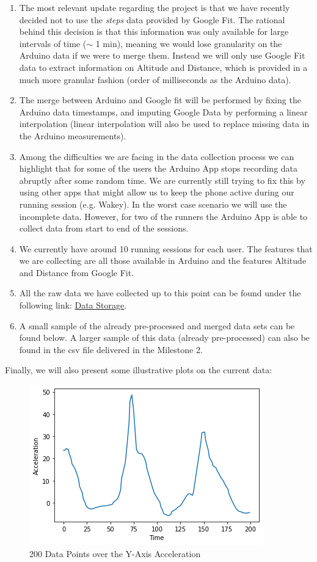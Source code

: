 \documentclass[
  12pt,
]{article}
\begin{document}
\begin{enumerate}
\item The most relevant update regarding the project is that we have recently decided not to use the \textit{steps} data provided by Google Fit. The rational behind this decision is that this information was only available for large intervals of time ($\sim$ 1 min), meaning we would lose granularity on the Arduino data if we were to merge them. Instead we will only use Google Fit data to extract information on Altitude and Distance, which is provided in a much more granular fashion (order of milliseconds as the Arduino data).
\item The merge between Arduino and Google fit will be performed by fixing the Arduino data timestamps, and imputing Google Data by performing a linear interpolation (linear interpolation will also be used to replace missing data in the Arduino measurements).
\item Among the difficulties we are facing in the data collection process we can highlight that for some of the users the Arduino App stops recording data abruptly after some random time. We are currently still trying to fix this by using other apps that might allow us to keep the phone active during our running session (e.g. Wakey). In the worst case scenario we will use the incomplete data. However, for two of the runners the Arduino App is able to collect data from start to end of the sessions.
\item We currently have around 10 running sessions for each user. The features that we are collecting are all those available in Arduino and the features Altitude and Distance from Google Fit.
\item All the raw data we have collected up to this point can be found under the following link: \href{https://drive.google.com/drive/u/1/folders/1mLCIF9zQHs7qVXGG03_Cj18c8y0vQie2}{Data Storage}.
\item A small sample of the already pre-processed and merged data sets can be found below. A larger sample of this data (already pre-processed) can also be found in the csv file delivered in the Milestone 2.
\end{enumerate}

Finally, we will also present some illustrative plots on the current
data:

\begin{figure}
\centering
\includegraphics{200_points.png}
\caption{200 Data Points over the Y-Axis Acceleration}
\end{figure}
\end{document}
